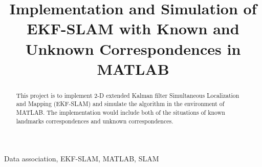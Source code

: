 \documentclass[conference]{IEEEtran}
\begin{document}
\title{Implementation and Simulation of EKF-SLAM with Known and Unknown Correspondences in MATLAB\\ %
}

\author{
\and
{}
}
\maketitle

\begin{abstract}
This project is to implement 2-D extended Kalman filter Simultaneous Localization and Mapping (EKF-SLAM) and simulate the algorithm in the environment of MATLAB. The implementation would include both of the situations of known landmarks correspondences and unknown correspondences.
\end{abstract}

\begin{IEEEkeywords}
Data association, EKF-SLAM, MATLAB, SLAM
\end{IEEEkeywords}

\end{document}
